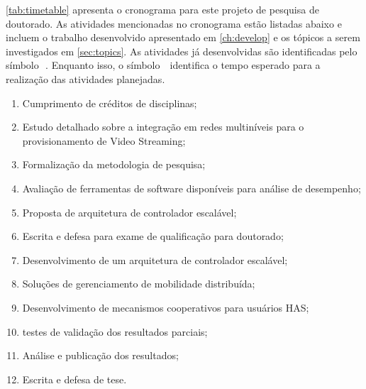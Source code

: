 \autoref{tab:timetable} apresenta o cronograma para este projeto de pesquisa de doutorado. As atividades mencionadas no cronograma estão listadas abaixo e incluem o trabalho desenvolvido apresentado em \autoref{ch:develop} e os tópicos a serem investigados em \autoref{sec:topics}. As atividades já desenvolvidas são identificadas pelo símbolo~\,\m. Enquanto isso, o símbolo \,\x\ identifica o tempo esperado para a realização das atividades planejadas.


\begin{enumerate}
	\itemsep0pt
	\item Cumprimento de créditos de disciplinas;
    \item Estudo detalhado sobre a integração em redes multiníveis para o provisionamento de Video Streaming;
    \item Formalização da metodologia de pesquisa;
    \item Avaliação de ferramentas de software disponíveis para análise de desempenho;
    \item Proposta de arquitetura de controlador escalável;
    \item Escrita e defesa para exame de qualificação para doutorado;
    \item Desenvolvimento de um arquitetura de controlador escalável;
    \item Soluções de gerenciamento de mobilidade distribuída;
    \item Desenvolvimento de mecanismos cooperativos para usuários HAS;
    \item testes de validação dos resultados parciais;
    \item Análise e publicação dos resultados;
    \item Escrita e defesa de tese.
\end{enumerate}

